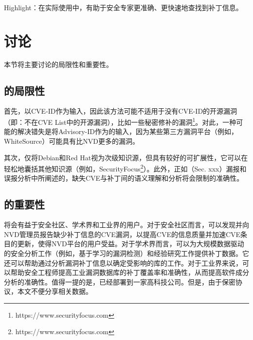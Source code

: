 \begin{tcolorbox}[size=title,opacityfill=0.15]
Highlight：在实际使用中，\tool 有助于安全专家更准确、更快速地查找到补丁信息。
\end{tcolorbox}

\section{讨论}
本节将主要讨论\tool 的局限性和重要性。
\subsection{\tool 的局限性}
首先，\tool 以CVE-ID作为输入，因此该方法可能不适用于没有CVE-ID的开源漏洞（即：不在CVE List中的开源漏洞），比如一些秘密修补的漏洞\footnote{https://www.securityfocus.com}。对此，一种可能的解决错失是将Advisory-ID作为\tool 的输入，因为某些第三方漏洞平台（例如，WhiteSource）可能具有比NVD更多的漏洞。

其次，\tool 仅将Debian和Red Hat视为次级知识源，但\tool 具有较好的可扩展性，它可以在轻松地囊括其他知识源（例如，SecurityFocus\footnote{https://www.securityfocus.com}）。此外，正如（Sec. xxx）\tool 漏报和误报分析中所阐述的，缺失CVE与补丁间的语义理解和分析将会限制\tool 的准确性。%

\subsection{\tool 的重要性}
\tool 将会有益于安全社区、学术界和工业界的用户。对于安全社区而言，\tool 可以发现并向NVD管理员报告缺少补丁信息的CVE漏洞，以提高CVE的信息质量并加速CVE条目的更新，使得NVD平台的用户受益。对于学术界而言，\tool 可以为大规模数据驱动的安全分析工作（例如，基于学习的漏洞检测\cite{li2018vuldeepecker,zhou2019devign}）和经验研究工作提供补丁数据。它还可以帮助通过分析漏洞补丁信息以确定受影响的库的工作\cite{dong2019towards}。对于工业界来说，\tool 可以帮助安全工程师提高工业漏洞数据库的补丁覆盖率和准确性，从而提高软件成分分析的准确性。值得一提的是，\tool 已经部署到一家高科技公司。但是，由于保密协议，本文不便分享相关数据。